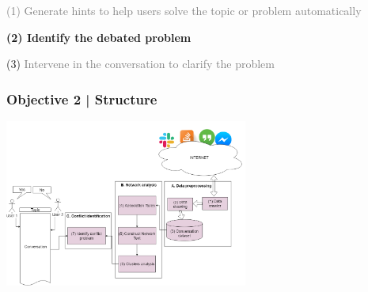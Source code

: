\documentclass{beamer}
\begin{document}

\begin{frame}
\par 	\textcolor{gray}{(1)  Generate hints to help users solve the topic or problem automatically}
\par \textbf{(2) Identify the debated  problem }
\par (3) \textcolor{gray}{ Intervene in the conversation to clarify the problem }
\end{frame}
\begin{frame}
\frametitle{Objective 2 | Structure}


\begin{center}
	\includegraphics[width=80mm]{32.png}
\end{center}

\end{frame}
\end{document}
